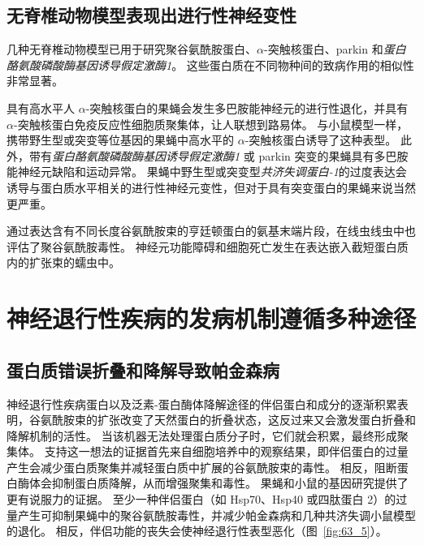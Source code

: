 \subsection{无脊椎动物模型表现出进行性神经变性}

几种无脊椎动物模型已用于研究聚谷氨酰胺蛋白、$\alpha$-突触核蛋白、parkin 和\textit{蛋白酪氨酸磷酸酶基因诱导假定激酶1}。
这些蛋白质在不同物种间的致病作用的相似性非常显著。


具有高水平人 $\alpha$-突触核蛋白的果蝇会发生多巴胺能神经元的进行性退化，并具有 $\alpha$-突触核蛋白免疫反应性细胞质聚集体，让人联想到路易体。
与小鼠模型一样，携带野生型或突变等位基因的果蝇中高水平的 $\alpha$-突触核蛋白诱导了这种表型。
此外，带有\textit{蛋白酪氨酸磷酸酶基因诱导假定激酶1} 或 parkin 突变的果蝇具有多巴胺能神经元缺陷和运动异常。
果蝇中野生型或突变型\textit{共济失调蛋白-1}的过度表达会诱导与蛋白质水平相关的进行性神经元变性，但对于具有突变蛋白的果蝇来说当然更严重。


通过表达含有不同长度谷氨酰胺束的亨廷顿蛋白的氨基末端片段，在线虫线虫中也评估了聚谷氨酰胺毒性。
神经元功能障碍和细胞死亡发生在表达嵌入截短蛋白质内的扩张束的蠕虫中。



\section{神经退行性疾病的发病机制遵循多种途径}

\subsection{蛋白质错误折叠和降解导致帕金森病}

神经退行性疾病蛋白以及泛素-蛋白酶体降解途径的伴侣蛋白和成分的逐渐积累表明，谷氨酰胺束的扩张改变了天然蛋白的折叠状态，这反过来又会激发蛋白折叠和降解机制的活性。
当该机器无法处理蛋白质分子时，它们就会积累，最终形成聚集体。
支持这一想法的证据首先来自细胞培养中的观察结果，即伴侣蛋白的过量产生会减少蛋白质聚集并减轻蛋白质中扩展的谷氨酰胺束的毒性。
相反，阻断蛋白酶体会抑制蛋白质降解，从而增强聚集和毒性。
果蝇和小鼠的基因研究提供了更有说服力的证据。
至少一种伴侣蛋白（如 Hsp70、Hsp40 或四肽蛋白 2）的过量产生可抑制果蝇中的聚谷氨酰胺毒性，并减少帕金森病和几种共济失调小鼠模型的退化。
相反，伴侣功能的丧失会使神经退行性表型恶化（图~\ref{fig:63_5}）。


